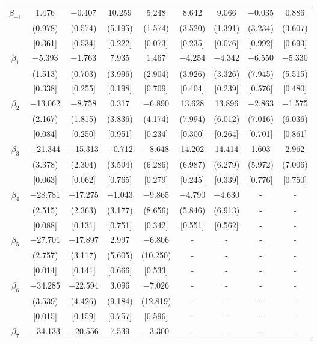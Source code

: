 \documentclass[12pt]{article}
\begin{document}
\begin{table}[h!]
\begin{adjustbox}{max width=\textwidth, scale=0.8}
\begin{tabular}{ccccccccc}
$\beta_{-1}$ & 1.476 & $-$0.407 & 10.259 & 5.248 & 8.642 & 9.066 & $-$0.035 & 0.886 \\
& (0.978) & (0.574) & (5.195) & (1.574) & (3.520) & (1.391) & (3.234) & (3.607) \\
& [0.361] & [0.534] & [0.222] & [0.073] & [0.235] & [0.076] & [0.992] & [0.693] \\
$\beta_{1}$ & $-$5.393 & $-$1.763 & 7.935 & 1.467 & $-$4.254 & $-$4.342 & $-$6.550 & $-$5.330 \\
& (1.513) & (0.703) & (3.996) & (2.904) & (3.926) & (3.326) & (7.945) & (5.515) \\
& [0.338] & [0.255] & [0.198] & [0.709] & [0.404] & [0.239] & [0.576] & [0.480] \\
$\beta_{2}$ & $-$13.062 & $-$8.758 & 0.317 & $-$6.890 & 13.628 & 13.896 & $-$2.863 & $-$1.575 \\
& (2.167) & (1.815) & (3.836) & (4.174) & (7.994) & (6.012) & (7.016) & (6.036) \\
& [0.084] & [0.250] & [0.951] & [0.234] & [0.300] & [0.264] & [0.701] & [0.861] \\
$\beta_{3}$ & $-$21.344 & $-$15.313 & $-$0.712 & $-$8.648 & 14.202 & 14.414 & 1.603 & 2.962 \\
& (3.378) & (2.304) & (3.594) & (6.286) & (6.987) & (6.279) & (5.972) & (7.006) \\
& [0.063] & [0.062] & [0.765] & [0.279] & [0.245] & [0.339] & [0.776] & [0.750] \\
$\beta_{4}$ & $-$28.781 & $-$17.275 & $-$1.043 & $-$9.865 & $-$4.790 & $-$4.630 & - & - \\
& (2.515) & (2.363) & (3.177) & (8.656) & (5.846) & (6.913) & - & - \\
& [0.088] & [0.131] & [0.751] & [0.342] & [0.551] & [0.562] & - & - \\
$\beta_{5}$ & $-$27.701 & $-$17.897 & 2.997 & $-$6.806 & - & - & - & - \\
& (2.757) & (3.117) & (5.605) & (10.250) & - & - & - & - \\
& [0.014] & [0.141] & [0.666] & [0.533] & - & - & - & - \\
$\beta_{6}$ & $-$34.285 & $-$22.594 & 3.096 & $-$7.026 & - & - & - & - \\
& (3.539) & (4.426) & (9.184) & (12.819) & - & - & - & - \\
& [0.015] & [0.159] & [0.757] & [0.596] & - & - & - & - \\
$\beta_{7}$ & $-$34.133 & $-$20.556 & 7.539 & $-$3.300 & - & - & - & - \\

\end{tabular}
\end{adjustbox}
\end{table}
\end{document}
